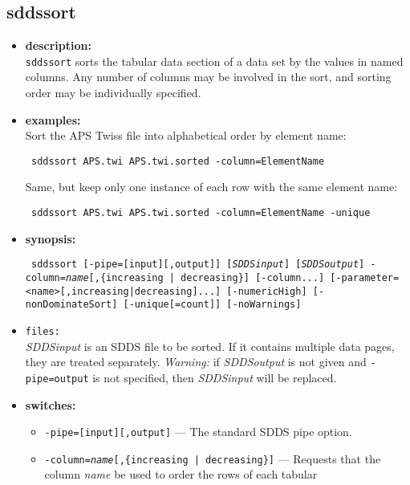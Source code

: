 \begin{latexonly}
\newpage
\end{latexonly}
\subsection{sddssort}
\label{sddssort}

\begin{itemize}
\item {\bf description:} \hspace*{1mm}\\
\verb|sddssort| sorts the tabular data section of a data set by the values in named columns.
Any number of columns may be involved in the sort, and sorting order may be individually specified.
\item {\bf examples:} \\
Sort the APS Twiss file into alphabetical order by element name:
\begin{flushleft}{\tt
sddssort APS.twi APS.twi.sorted -column=ElementName
}\end{flushleft}
Same, but keep only one instance of each row with the same element name:
\begin{flushleft}{\tt
sddssort APS.twi APS.twi.sorted -column=ElementName -unique
}\end{flushleft}
\item {\bf synopsis:} \\
\begin{flushleft}{\tt
sddssort [-pipe=[input][,output]] [{\em SDDSinput}] [{\em SDDSoutput}] 
-column={\em name}[,\{increasing | decreasing\}] [-column...] 
[-parameter=<name>[,{increasing|decreasing}]...]
[-numericHigh] [-nonDominateSort] 
[-unique[=count]] [-noWarnings]
}\end{flushleft}
\item {\tt files:}\\
{\em SDDSinput} is an SDDS file to be sorted.  If it contains multiple data pages, they
are treated separately.  {\em Warning: } if {\em SDDSoutput} is not given and {\tt -pipe=output}  is not
specified, then {\em SDDSinput} will be replaced.
\item {\bf switches:}
    \begin{itemize}
    \item {\tt -pipe=[input][,output]} --- The standard SDDS pipe option.
    \item {\tt -column={\em name}[,\{increasing | decreasing\}]} --- Requests that the column 
        {\em name} be used to order the rows of each tabular

\end{itemize}
\end{itemize}
